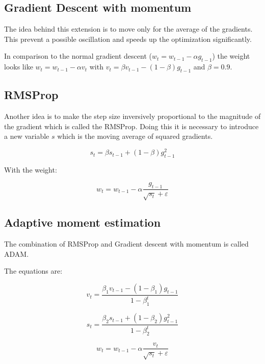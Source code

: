\subsection{Gradient Descent with momentum}

The idea behind this extension is to move only for the average of the gradients.
This prevent a possible oscillation and speeds up the optimization significantly.

In comparison to the normal gradient descent ($w_t = w_{t-1} - \alpha g_{t-1}$) the weight looks like $w_t = w_{t-1} - \alpha v_t$ with $v_t = \beta v_{t-1} - (1 -\beta)g_{t-1}$ and $\beta = 0.9$.

\subsection{RMSProp}

Another idea is to make the step size inversively proportional to the magnitude of the gradient which is called the \ac{RMSProp}.
Doing this it is necessary to introduce a new variable $s$ which is the moving average of squared gradients.

\begin{equation}\label{RMS1}
    s_t = \beta s_{t-1} + (1 - \beta)g^2_{t-1}
\end{equation}

With the weight:

\begin{equation}\label{RMS2}
    w_t = w_{t-1} - \alpha \frac{g_{t-1}}{\sqrt{s_t}+\varepsilon}
\end{equation}

\subsection{Adaptive moment estimation}

The combination of \ac{RMSProp} and Gradient descent with momentum is called \ac{ADAM}.

The equations are:


\begin{equation}\label{ADAM1}
    v_t = \frac{\beta_1 v_{t-1} - (1 - \beta_1)g_{t-1}}{1 - \beta^t_1}
\end{equation}

\begin{equation}\label{ADAM2}
    s_t = \frac{\beta_2 s_{t-1} + (1 - \beta_2)g^2_{t-1}}{1 - \beta^t_2}
\end{equation}

\begin{equation}\label{RMS2}
    w_t = w_{t-1} - \alpha \frac{v_t}{\sqrt{s_t}+\varepsilon}
\end{equation}

